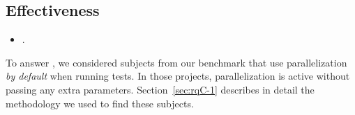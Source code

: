 

\subsection{Effectiveness}
\label{sec:rqD}

\begin{itemize}
    \item \numRQD{}. \textbf{\RQD}
\end{itemize}

To answer \numRQD{}, we considered \numProjectsPar{} subjects from our
benchmark that use parallelization \emph{by default} when running
tests.  In those projects, parallelization is active without passing
any extra parameters.  Section~\ref{sec:rqC-1} describes in detail the
methodology we used to find these subjects.

